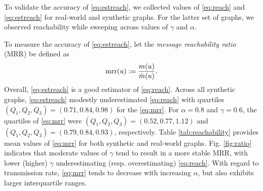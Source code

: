 \par To validate the accuracy of \eqref{eq:estreach}, we collected values of \eqref{eq:reach} and \eqref{eq:estreach} for real-world and synthetic graphs. For the latter set of graphs, we observed reachability while sweeping across values of $\gamma$ and $\alpha$.

\par To measure the accuracy of \eqref{eq:estreach}, let the \emph{message reachability ratio} (MRR) be defined as
\begin{equation}\label{eq:mrr}
	\operatorname{mrr}(u) := \frac{m(u)}{\hat{m}(u)}.
\end{equation}
Overall, \eqref{eq:estreach} is a good estimator of \eqref{eq:reach}. Across all synthetic graphs, \eqref{eq:estreach} modestly underestimated \eqref{eq:reach} with quartiles $(Q_1, Q_2, Q_3) = (0.71, 0.84, 0.98)$ for the \eqref{eq:mrr}. For $\alpha = 0.8$ and $\gamma = 0.6$, the quartiles of \eqref{eq:mrr} were $(Q_1, Q_2, Q_3) = (0.52, 0.77, 1.12)$ and $(Q_1, Q_2, Q_3) = (0.79, 0.84, 0.93)$, respectively. Table \ref{tab:reachability} provides mean values of \eqref{eq:mrr} for both synthetic and real-world graphs. Fig. \ref{fig:ratio} indicates that moderate values of $\gamma$ tend to result in a more stable MRR, with lower (higher) $\gamma$ underestimating (resp. overestimating) \eqref{eq:reach}. With regard to transmission rate, \eqref{eq:mrr} tends to decrease with increasing $\alpha$, but also exhibits larger interquartile ranges.

